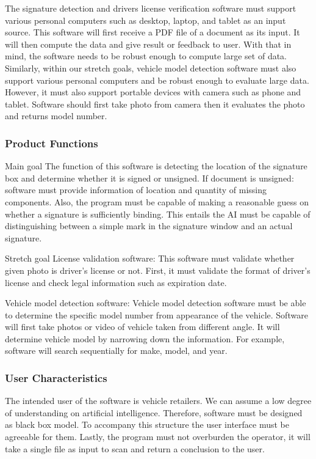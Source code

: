 \documentclass[article, onecolumn, draftclsnofoot,10pt, compsoc]{IEEEtran}
\begin{document}
The signature detection and drivers license verification software must support various personal computers such as desktop, laptop, and tablet as an input source. This software will first receive a PDF file of a document as its input. It will then compute the data and give result or feedback to user. With that in mind, the software needs to be robust enough to compute large set of data. Similarly, within our stretch goals, vehicle model detection software must also support various personal computers and be robust enough to evaluate large data. However, it must also support portable devices with camera such as phone and tablet. Software should first take photo from camera then it evaluates the photo and returns model number.

\subsubsection{Product Functions}
Main goal
The function of this software is detecting the location of the signature box and determine whether it is signed or unsigned. If document is unsigned: software must provide information of location and quantity of missing components. Also, the program must be capable of making a reasonable guess on whether a signature is sufficiently binding. This entails the AI must be capable of distinguishing between a simple mark in the signature window and an actual signature.

Stretch goal
License validation software: This software must validate whether given photo is driver’s license or not. First, it must validate the format of driver’s license and check legal information such as expiration date.

Vehicle model detection software: Vehicle model detection software must be able to determine the specific model number from appearance of the vehicle. Software will first take photos or video of vehicle taken from different angle. It will determine vehicle model by narrowing down the information. For example, software will search sequentially for make, model, and year.

\subsubsection{User Characteristics}
The intended user of the software is vehicle retailers. We can assume a low degree of understanding on artificial intelligence. Therefore, software must be designed as black box model. To accompany this structure the user interface must be agreeable for them. Lastly, the program must not overburden the operator, it will take a single file as input to scan and return a conclusion to the user.
\end{document}
